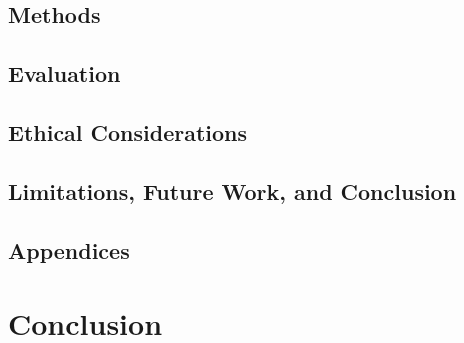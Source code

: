 \documentclass[10pt,twocolumn]{article}
\begin{document}
\subsection{Methods}

\subsection{Evaluation}

\subsection{Ethical Considerations}

\subsection{Limitations, Future Work, and Conclusion}

\subsection{Appendices}

\section{Conclusion}

\printbibliography 
\end{document}
